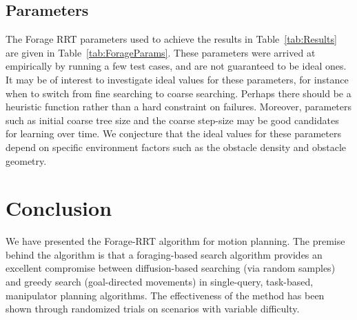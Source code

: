 \documentclass[conference]{IEEEtran}
\begin{document}
\subsection{Parameters}
The Forage RRT parameters used to achieve the results in
Table~\ref{tab:Results} are given in Table~\ref{tab:ForageParams}. These
parameters were arrived at empirically by running a few test cases, 
and are not guaranteed to be ideal ones. It may be of interest to
investigate ideal values for these parameters, for instance when to switch
from fine searching to coarse searching. Perhaps there should be a
heuristic function rather than a hard constraint on failures. Moreover, 
parameters such as initial coarse tree size and the coarse step-size may be 
good candidates for learning over time. We conjecture that the ideal
values for these parameters depend on specific environment factors such as
the obstacle density and obstacle geometry. 


\section{Conclusion}
We have presented the Forage-RRT algorithm for motion planning. The premise
behind the algorithm is that a foraging-based search algorithm provides an 
excellent compromise between diffusion-based searching (via random samples) 
and greedy search (goal-directed movements) in single-query, task-based, 
manipulator planning algorithms.  The effectiveness of the method has been
shown through randomized trials on scenarios with variable difficulty.
\end{document}
